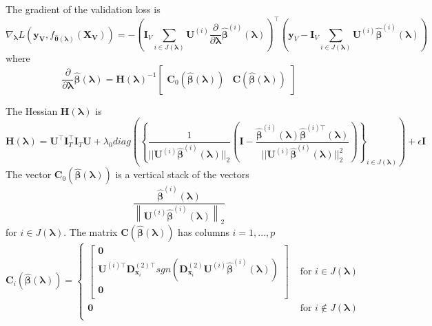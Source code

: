\documentclass[12pt,letterpaper]{article}
\begin{document}
The gradient of the validation loss is
\begin{equation}
\nabla_{\boldsymbol \lambda} L(\boldsymbol{y_V}, f_{\hat{\boldsymbol{\theta}}(\boldsymbol{\lambda})}(\boldsymbol{X_V})) =
-
\left (
\boldsymbol{I}_V \sum_{i\in J(\boldsymbol\lambda)}  \boldsymbol {U}^{(i)} \frac{\partial}{\partial \boldsymbol\lambda} \hat{\boldsymbol{\beta}}^{(i)}(\boldsymbol{\lambda})
\right )^\top
\left (
\boldsymbol{y}_V - \boldsymbol{I}_V \sum_{i\in J(\boldsymbol\lambda)} \boldsymbol {U}^{(i)} \hat{\boldsymbol{\beta}}^{(i)} (\boldsymbol\lambda)
\right )
\end{equation}
where
\begin{equation}
\frac{\partial}{\partial \boldsymbol{\lambda}} 
\hat{\boldsymbol{\beta}}(\boldsymbol{\lambda})
= 
\boldsymbol{H}(\boldsymbol\lambda)^{-1}
\begin{bmatrix}
\boldsymbol{C}_0(\hat{\boldsymbol{\beta}}(\boldsymbol{\lambda}))
&
\boldsymbol C \left (\hat{\boldsymbol \beta}( \boldsymbol \lambda) \right )
\end{bmatrix}
\label{eq:additive_gradient}
\end{equation}

The Hessian $\boldsymbol{H}(\boldsymbol\lambda)$ is
\begin{equation}
\boldsymbol{H}(\boldsymbol\lambda)
= \boldsymbol{U}^\top \boldsymbol I_T^\top \boldsymbol I_T \boldsymbol{U}
+ \lambda_0 diag  \left ( \left \{
\frac{1}{||\boldsymbol {U}^{(i)}  \hat{\boldsymbol{\beta}}^{(i)} (\boldsymbol \lambda)||_2} \left (
\boldsymbol I - \frac{\hat{\boldsymbol{\beta}}^{(i)} (\boldsymbol \lambda) \hat{\boldsymbol{\beta}}^{(i)\top} (\boldsymbol \lambda)}{||\boldsymbol {U}^{(i)}  \hat{\boldsymbol{\beta}}^{(i)} (\boldsymbol \lambda)||_2^2}
\right )
\right \}_{i \in J(\boldsymbol{\lambda})}
 \right )
+ \epsilon \boldsymbol I
\label{eq:add_hessian}
\end{equation}
The vector $\boldsymbol{C}_0(\hat{\boldsymbol{\beta}}(\boldsymbol{\lambda}))$ is a vertical stack of the vectors 
$$
\frac{\hat{\boldsymbol{\beta}}^{(i)}(\boldsymbol \lambda)}{\left \| \boldsymbol {U}^{(i)}  \hat{\boldsymbol{\beta}}^{(i)} (\boldsymbol \lambda)\right \|_2}
$$
for $i \in J(\boldsymbol{\lambda})$.
The matrix $\boldsymbol C(\hat{\boldsymbol \beta}( \boldsymbol \lambda))$ has columns $i = 1,...,p$
\begin{equation}
\boldsymbol{C}_i(\hat{\boldsymbol \beta}( \boldsymbol \lambda))
= \begin{cases}
\begin{bmatrix}
\boldsymbol{0} \\
\boldsymbol {U}^{(i)\top}  \boldsymbol{D}^{(2)\top}_{\boldsymbol{x}_i} 
sgn \left ( \boldsymbol{D}^{(2)}_{\boldsymbol{x}_i} \boldsymbol {U}^{(i)} \hat{\boldsymbol{\beta}}^{(i)} ( \boldsymbol \lambda) \right ) \\
\boldsymbol{0} \\
\end{bmatrix}
& \text{ for } i \in J(\boldsymbol \lambda) \\
\boldsymbol{0}
& \text{ for } i \not\in J(\boldsymbol \lambda) \\
\end{cases}
\end{equation}
\end{document}
